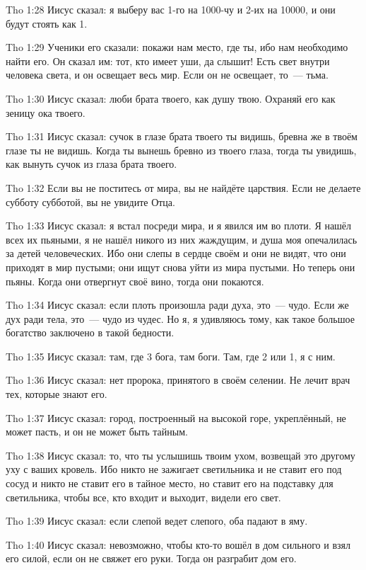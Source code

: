 \vs Tho 1:28
Иисус сказал:
я выберу вас 1-го на 1000-чу и 2-их на 10000, и они будут стоять как 1.

\vs Tho 1:29
Ученики его сказали:
покажи нам место, где ты, ибо нам необходимо найти его.
Он сказал им: тот, кто имеет уши, да слышит!
Есть свет внутри человека света, и он освещает весь мир.
Если он не освещает, то~--- тьма.

\vs Tho 1:30
Иисус сказал:
люби брата твоего, как душу твою.
Охраняй его как зеницу ока твоего.

\vs Tho 1:31
Иисус сказал:
сучок в глазе брата твоего ты видишь,
бревна же в твоём глазе ты не видишь.
Когда ты вынешь бревно из твоего глаза,
тогда ты увидишь, как вынуть сучок из глаза брата твоего.

\vs Tho 1:32
Если вы не поститесь от мира, вы не найдёте царствия.
Если не делаете субботу субботой, вы не увидите Отца.

\vs Tho 1:33
Иисус сказал:
я встал посреди мира, и я явился им во плоти.
Я нашёл всех их пьяными, я не нашёл никого из них жаждущим,
и душа моя опечалилась за детей человеческих.
Ибо они слепы в сердце своём и они не видят,
что они приходят в мир пустыми;
они ищут снова уйти из мира пустыми.
Но теперь они пьяны.
Когда они отвергнут своё вино, тогда они покаются.

\vs Tho 1:34
Иисус сказал:
если плоть произошла ради духа, это~--- чудо.
Если же дух ради тела, это~--- чудо из чудес.
Но я, я удивляюсь тому,
как такое большое богатство заключено в такой бедности.

\vs Tho 1:35
Иисус сказал:
там, где 3 бога, там боги.
Там, где 2 или 1, я с ним.

\vs Tho 1:36
Иисус сказал:
нет пророка, принятого в своём селении.
Не лечит врач тех, которые знают его.

\vs Tho 1:37
Иисус сказал:
город, построенный на высокой горе, укреплённый,
не может пасть, и он не может быть тайным.

\vs Tho 1:38
Иисус сказал:
то, что ты услышишь твоим ухом,
возвещай это другому уху с ваших кровель.
Ибо никто не зажигает светильника
и не ставит его под сосуд
и никто не ставит его в тайное место,
но ставит его на подставку для светильника,
чтобы все, кто входит и выходит, видели его свет.

\vs Tho 1:39
Иисус сказал: если слепой ведет слепого, оба падают в яму.

\vs Tho 1:40
Иисус сказал: невозможно, чтобы кто-то вошёл в дом сильного и
взял его силой, если он не свяжет его руки.
Тогда он разграбит дом его.

